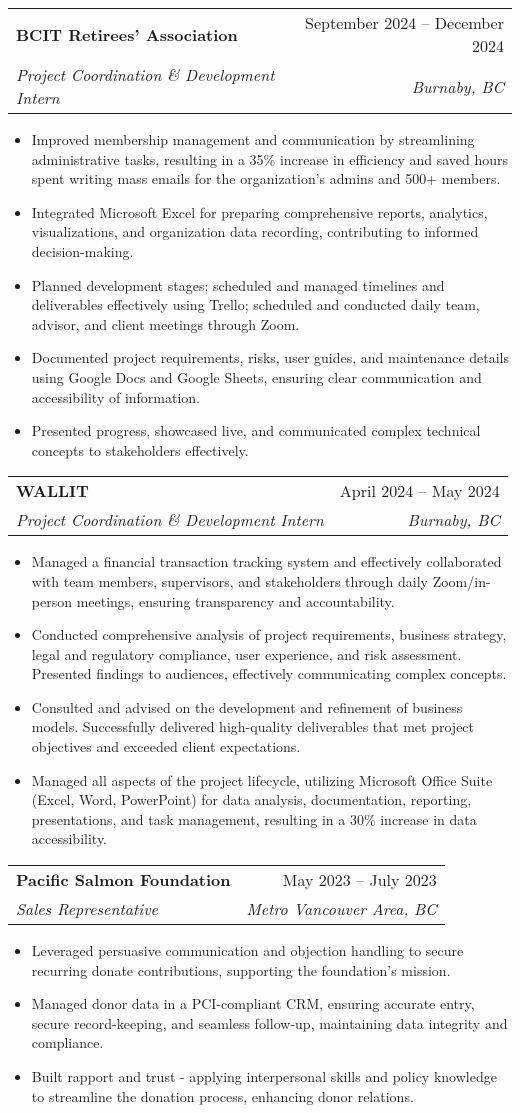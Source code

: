 \documentclass[letterpaper,11pt]{article}
\makeatletter
\newcommand{\resumeItem}[1]{
\item\small{
{#1 \vspace{-2pt}}
}
}
\newcommand{\resumeSubheading}[4]{
\vspace{-2pt}\item
\begin{tabular*}{0.97\textwidth}[t]{l@{\extracolsep{\fill}}r}
\textbf{#1} & #2 \\
\textit{\small#3} & \textit{\small #4} \\
\end{tabular*}\vspace{-7pt}
}
\newcommand{\resumeItemListStart}{\begin{itemize}}
\newcommand{\resumeItemListEnd}{\end{itemize}\vspace{-5pt}}
\makeatother
\begin{document}
\resumeSubheading{BCIT Retirees' Association}{September 2024 – December 2024}{Project Coordination \& Development Intern}{Burnaby, BC}
\resumeItemListStart
\resumeItem{Improved membership management and communication by streamlining administrative tasks, resulting in a 35\% increase in efficiency and saved hours spent writing mass emails for the organization's admins and 500+ members.}
\resumeItem{Integrated Microsoft Excel for preparing comprehensive reports, analytics, visualizations, and organization data recording, contributing to informed decision-making.}
\resumeItem{Planned development stages; scheduled and managed timelines and deliverables effectively using Trello; scheduled and conducted daily team, advisor, and client meetings through Zoom.}
\resumeItem{Documented project requirements, risks, user guides, and maintenance details using Google Docs and Google Sheets, ensuring clear communication and accessibility of information.}
\resumeItem{Presented progress, showcased live, and communicated complex technical concepts to stakeholders effectively.}
\resumeItemListEnd

\resumeSubheading{WALLIT}{April 2024 – May 2024}{Project Coordination \& Development Intern}{Burnaby, BC}
\resumeItemListStart
\resumeItem{Managed a financial transaction tracking system and effectively collaborated with team members, supervisors, and stakeholders through daily Zoom/in-person meetings, ensuring transparency and accountability.}
\resumeItem{Conducted comprehensive analysis of project requirements, business strategy, legal and regulatory compliance, user experience, and risk assessment. Presented findings to audiences, effectively communicating complex concepts.}
\resumeItem{Consulted and advised on the development and refinement of business models. Successfully delivered high-quality deliverables that met project objectives and exceeded client expectations.}
\resumeItem{Managed all aspects of the project lifecycle, utilizing Microsoft Office Suite (Excel, Word, PowerPoint) for data analysis, documentation, reporting, presentations, and task management, resulting in a 30\% increase in data accessibility.}
\resumeItemListEnd

\resumeSubheading{Pacific Salmon Foundation}{May 2023 – July 2023}{Sales Representative}{Metro Vancouver Area, BC}
\resumeItemListStart
\resumeItem{Leveraged persuasive communication and objection handling to secure recurring donate contributions, supporting the foundation's mission.}
\resumeItem{Managed donor data in a PCI-compliant CRM, ensuring accurate entry, secure record-keeping, and seamless follow-up, maintaining data integrity and compliance.}
\resumeItem{Built rapport and trust - applying interpersonal skills and policy knowledge to streamline the donation process, enhancing donor relations.}
\resumeItemListEnd
\end{document}

